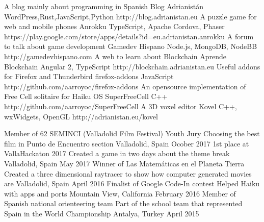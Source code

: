 \documentclass[]{awesome-cv}
\begin{document}
\vspace{-7mm}
\begin{cventries}
	\cventry
	{A blog mainly about programming in Spanish}
	{Blog Adrianistán}
	{WordPress,Rust,JavaScript,Python}
	{http://blog.adrianistan.eu}
	{}
	\cventry
	{A puzzle game for web and mobile phones}
	{Anrokku}
	{TypeScript, Apache Cordova, Phaser}
	{}
	{https://play.google.com/store/apps/details?id=eu.adrianistan.anrokku}
	\cventry
	{A forum to talk about game development}
	{Gamedev Hispano}
	{Node.js, MongoDB, NodeBB}
	{http://gamedevhispano.com}
	{}
	\cventry
	{A web to learn about Blockchain}
	{Aprende Blockchain}
	{Angular 2, TypeScript}
	{http://blockchain.adrianistan.eu}
	{}
	\cventry
	{Useful addons for Firefox and Thunderbird}
	{firefox-addons}
	{JavaScript}
	{http://github.com/aarroyoc/firefox-addons}
	{}
	\cventry
	{An opensource implementation of Free Cell solitaire for Haiku OS}
	{SuperFreeCell}
	{C++}
	{http://github.com/aarroyoc/SuperFreeCell}
	{}
	\cventry
	{A 3D voxel editor}
	{Kovel}
	{C++, wxWidgets, OpenGL}
	{http://adrianistan.eu/kovel}
	{}

	\vspace{-5mm}
\end{cventries}
\begin{cvhonors}
	\cvhonor
	{Member of 62 SEMINCI (Valladolid Film Festival) Youth Jury}
	{Choosing the best film in Punto de Encuentro section}
	{Valladolid, Spain}
	{Ocober 2017}
	\cvhonor
	{1st place at VallaHackaton 2017}
	{Created a game in two days about the theme \textquotedbl{}break\textquotedbl{}}
	{Valladolid, Spain}
	{May 2017}
	\cvhonor
	{Winner of \textquotedbl{}Las Matemáticas en el Planeta Tierra\textquotedbl{}}
	{Created a three dimensional raytracer to show how computer generated movies are}
	{Valladolid, Spain}
	{April 2016}
	\cvhonor
	{Finalist of Google Code-In contest}
	{Helped Haiku with apps and ports}
	{Mountain View, California}
	{February 2016}
	\cvhonor
	{Member of Spanish national orienteering team}
	{Part of the school team that represented Spain in the World Championship}
	{Antalya, Turkey}
	{April 2015}
\end{cvhonors}
\ 
\end{document}
